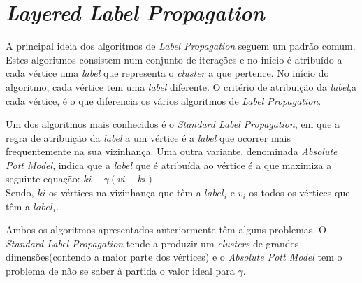 \documentclass[a4paper,10pt]{report}
\begin{document}
\section*{\textit{Layered Label Propagation}}

  A principal ideia dos algoritmos de \textit{Label Propagation} seguem um padrão comum. Estes algoritmos consistem num conjunto de iterações e no início é atribuído a cada vértice uma \textit{label} que representa o \textit{cluster} a que pertence. No início do algoritmo, cada vértice tem uma \textit{label} diferente. O critério de atribuição da \textit{label},a cada vértice, é o que diferencia os vários algoritmos de \textit{Label Propagation}. 
  
  Um dos algoritmos mais conhecidos é o \textit{Standard Label Propagation}, em que a regra de atribuição da \textit{label} a um vértice é a \textit{label} que ocorrer mais frequentemente na sua vizinhança. Uma outra variante, denominada \textit{Absolute Pott Model}, indica que a \textit{label} que é atribuída ao vértice é a que maximiza a seguinte equação: $ki-\gamma(vi-ki)$\\
  Sendo, $ki$ os vértices na vizinhança que têm a $label_i$ e $v_i$ os todos os vértices que têm a $label_i$.
  
  Ambos os algoritmos apresentados anteriormente têm alguns problemas. O \textit{Standard Label Propagation} tende a produzir um \textit{clusters} de grandes dimensões(contendo a maior parte dos vértices) e o \textit{Absolute Pott Model} tem o problema de não se saber à partida o valor ideal para $\gamma$.
  
\end{document}

